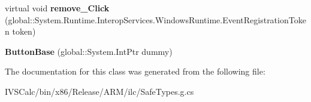 \begin{DoxyCompactItemize}
virtual void {\bfseries remove\+\_\+\+Click} (global\+::\+System.\+Runtime.\+Interop\+Services.\+Windows\+Runtime.\+Event\+Registration\+Token token)
\item 
\mbox{\label{class_windows_1_1_u_i_1_1_xaml_1_1_controls_1_1_primitives_1_1_button_base_a851f5f68708d5a8ca328fd2bb6c9e52f}} 
{\bfseries Button\+Base} (global\+::\+System.\+Int\+Ptr dummy)
\end{DoxyCompactItemize}


The documentation for this class was generated from the following file\+:\begin{DoxyCompactItemize}
\item 
I\+V\+S\+Calc/bin/x86/\+Release/\+A\+R\+M/ilc/Safe\+Types.\+g.\+cs\end{DoxyCompactItemize}
